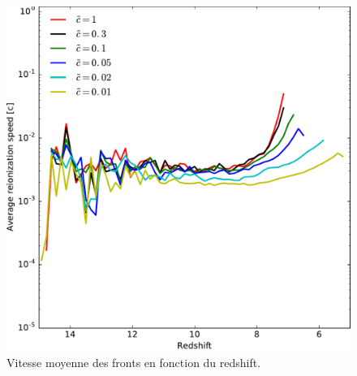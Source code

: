 \begin{figure}[htpb]
        \includegraphics[width=.95\linewidth]{img/04_mapreio/avg_reionization_speed.pdf} 
        \caption{Vitesse moyenne des fronts en fonction du redshift.
        }
 		\label{fig:vreioz}
\end{figure}


